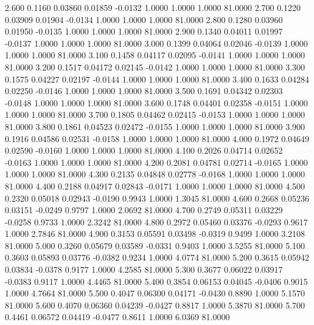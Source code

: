   2.600   0.1160   0.03860   0.01859  -0.0132   1.0000   1.0000   1.0000  81.0000
   2.700   0.1220   0.03909   0.01904  -0.0134   1.0000   1.0000   1.0000  81.0000
   2.800   0.1280   0.03960   0.01950  -0.0135   1.0000   1.0000   1.0000  81.0000
   2.900   0.1340   0.04011   0.01997  -0.0137   1.0000   1.0000   1.0000  81.0000
   3.000   0.1399   0.04064   0.02046  -0.0139   1.0000   1.0000   1.0000  81.0000
   3.100   0.1458   0.04117   0.02095  -0.0141   1.0000   1.0000   1.0000  81.0000
   3.200   0.1517   0.04172   0.02145  -0.0142   1.0000   1.0000   1.0000  81.0000
   3.300   0.1575   0.04227   0.02197  -0.0144   1.0000   1.0000   1.0000  81.0000
   3.400   0.1633   0.04284   0.02250  -0.0146   1.0000   1.0000   1.0000  81.0000
   3.500   0.1691   0.04342   0.02303  -0.0148   1.0000   1.0000   1.0000  81.0000
   3.600   0.1748   0.04401   0.02358  -0.0151   1.0000   1.0000   1.0000  81.0000
   3.700   0.1805   0.04462   0.02415  -0.0153   1.0000   1.0000   1.0000  81.0000
   3.800   0.1861   0.04523   0.02472  -0.0155   1.0000   1.0000   1.0000  81.0000
   3.900   0.1916   0.04586   0.02531  -0.0158   1.0000   1.0000   1.0000  81.0000
   4.000   0.1972   0.04649   0.02590  -0.0160   1.0000   1.0000   1.0000  81.0000
   4.100   0.2026   0.04714   0.02652  -0.0163   1.0000   1.0000   1.0000  81.0000
   4.200   0.2081   0.04781   0.02714  -0.0165   1.0000   1.0000   1.0000  81.0000
   4.300   0.2135   0.04848   0.02778  -0.0168   1.0000   1.0000   1.0000  81.0000
   4.400   0.2188   0.04917   0.02843  -0.0171   1.0000   1.0000   1.0000  81.0000
   4.500   0.2320   0.05018   0.02943  -0.0190   0.9943   1.0000   1.3045  81.0000
   4.600   0.2668   0.05236   0.03151  -0.0249   0.9797   1.0000   2.0692  81.0000
   4.700   0.2749   0.05311   0.03229  -0.0258   0.9733   1.0000   2.3242  81.0000
   4.800   0.2972   0.05460   0.03376  -0.0293   0.9617   1.0000   2.7846  81.0000
   4.900   0.3153   0.05591   0.03498  -0.0319   0.9499   1.0000   3.2108  81.0000
   5.000   0.3260   0.05679   0.03589  -0.0331   0.9403   1.0000   3.5255  81.0000
   5.100   0.3603   0.05893   0.03776  -0.0382   0.9234   1.0000   4.0774  81.0000
   5.200   0.3615   0.05942   0.03834  -0.0378   0.9177   1.0000   4.2585  81.0000
   5.300   0.3677   0.06022   0.03917  -0.0383   0.9117   1.0000   4.4465  81.0000
   5.400   0.3854   0.06153   0.04045  -0.0406   0.9015   1.0000   4.7664  81.0000
   5.500   0.4047   0.06300   0.04171  -0.0430   0.8890   1.0000   5.1570  81.0000
   5.600   0.4070   0.06360   0.04239  -0.0427   0.8817   1.0000   5.3870  81.0000
   5.700   0.4461   0.06572   0.04419  -0.0477   0.8611   1.0000   6.0369  81.0000
